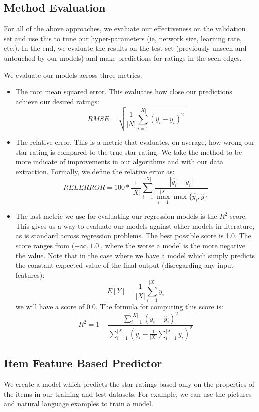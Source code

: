 \documentclass[letterpaper, 10 pt, conference]{ieeeconf}  %
\begin{document}
\subsection{Method Evaluation}

For all of the above approaches, we evaluate our effectiveness on the validation set and use this to tune our hyper-parameters (ie, network size, learning rate, etc.). In the end, we evaluate the results on the test set (previously unseen and untouched by our models) and make predictions for ratings in the seen edges. 

We evaluate our models across three metrics:

\begin{itemize}
\item The root mean squared error. This evaluates how close our predictions achieve our desired ratings:
$$
RMSE = \sqrt{\frac{1}{|N|}\sum_{i = 1}^{|X|} (\hat{y}_i - y_i)^2}
$$
\item The relative error. This is a metric that evaluates, on average, how wrong our star rating is compared to the true star rating. We take the method to be more indicate of improvements in our algorithms and with our data extraction. Formally, we define the relative error as:
$$
RELERROR = 100*\frac{1}{|X|}\sum_{i=1}^{|X|} \frac{|\hat{y_i} - y_i|}{\max_{i=1}^{|X|} \max\{\hat{y_i}, \hat{y}\}}
$$
\item The last metric we use for evaluating our regression models is the $R^2$ score. This gives us a way to evaluate our models against other models in literature, as is standard across regression problems. The best possible score is 1.0. The score ranges from $(-\infty, 1.0]$, where the worse a model is the more negative the value. Note that in the case where we have a model which simply predicts the constant expected value of the final output (disregarding any input features):
$$
E[Y] = \frac{1}{|X|}\sum_{i=1}^{|X|} y_{i}
$$
we will have a score of $0.0$. The formula for computing this score is:
$$
R^2 = 1 - \frac{\sum_{i=1}^{|X|}(y_i - \hat{y}_i)^2}{\sum_{i=1}^{|X|} \left(y_i - \frac{1}{|X|}\sum_{i=1}^{|X|}y_i\right)^2}
$$

\end{itemize}

\subsection{Item Feature Based Predictor}

We create a model which predicts the star ratings based only on the properties of the items in our training and test datasets. For example, we can use the pictures and natural language examples to train a model.
\end{document}
